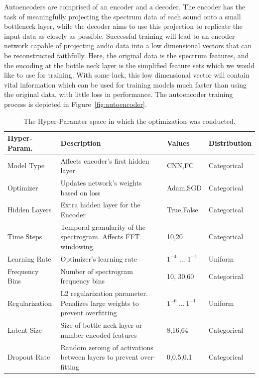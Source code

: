 \documentclass[\main/thesis.tex]{subfiles}
\begin{document}
Autoencoders are comprised of an encoder and a decoder. The encoder has the task of meaningfully projecting the spectrum data of each sound onto a small bottleneck layer, while the decoder aims to use this projection to replicate the input data as closely as possible. Successful training will lead to an encoder network capable of projecting audio data into a low dimensional vectors that can be reconstructed faithfully. Here, the original data is the spectrum features, and the encoding at the bottle neck layer is the simplified feature sets which we would like to use for training. With some luck, this low dimensional vector will contain vital information which can be used for training models much faster than using the original data, with little loss in performance. The autoencoder training process is depicted in Figure~\ref{fig:autoencoder}.
\begin{table}[h!]

\begin{tabular}{|p{28mm}|p{50mm}|p{21mm}|p{21mm}|}
\hline
Hyper-Param. & Description  & Values & Distribution\\ \hline
Model Type      &   Affects encoder's first hidden layer & CNN,FC & Categorical \\  \hline
Optimizer       & Updates network's weights based on loss & Adam,SGD & Categorical  \\  \hline
Hidden Layers   & Extra hidden layer for the Encoder & True,False & Categorical \\  \hline
Time Steps & Temporal granularity of the spectrogram. Affects FFT windowing. & 10,20 & Categorical  \\ \hline
Learning Rate   &    Optimizer's learning rate  & $1^{-4}$ ... $1^{-1}$ & Uniform      \\ \hline
Frequency Bins & Number of spectrogram frequency bins & 10, 30,60 & Categorical \\ \hline

Regularization  &  L2 regularization parameter. Penalizes large weights to prevent overfitting & $1^{-6}~...~1^{-1}$ & Uniform\\ \hline
Latent Size & Size of bottle neck layer or number encoded features & 8,16,64 & Categorical              \\ \hline
Dropout Rate & Random zeroing of activations between layers to prevent over-fitting & 0,0.5,0.1 & Categorical\\  \hline
\end{tabular}
\caption{The Hyper-Paramter space in which the optimization was conducted.}
\label{table:hyper_params}
\end{table}
\end{document}

